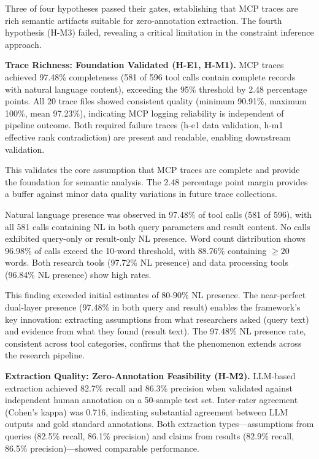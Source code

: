 
Three of four hypotheses passed their gates, establishing that MCP traces are rich semantic artifacts suitable for zero-annotation extraction. The fourth hypothesis (H-M3) failed, revealing a critical limitation in the constraint inference approach.

\textbf{Trace Richness: Foundation Validated (H-E1, H-M1).} MCP traces achieved 97.48\% completeness (581 of 596 tool calls contain complete records with natural language content), exceeding the 95\% threshold by 2.48 percentage points. All 20 trace files showed consistent quality (minimum 90.91\%, maximum 100\%, mean 97.23\%), indicating MCP logging reliability is independent of pipeline outcome. Both required failure traces (h-e1 data validation, h-m1 effective rank contradiction) are present and readable, enabling downstream validation.

This validates the core assumption that MCP traces are complete and provide the foundation for semantic analysis. The 2.48 percentage point margin provides a buffer against minor data quality variations in future trace collections.

Natural language presence was observed in 97.48\% of tool calls (581 of 596), with all 581 calls containing NL in both query parameters and result content. No calls exhibited query-only or result-only NL presence. Word count distribution shows 96.98\% of calls exceed the 10-word threshold, with 88.76\% containing $\geq 20$ words. Both research tools (97.72\% NL presence) and data processing tools (96.84\% NL presence) show high rates.

This finding exceeded initial estimates of 80-90\% NL presence. The near-perfect dual-layer presence (97.48\% in both query and result) enables the framework's key innovation: extracting assumptions from what researchers asked (query text) and evidence from what they found (result text). The 97.48\% NL presence rate, consistent across tool categories, confirms that the phenomenon extends across the research pipeline.

\textbf{Extraction Quality: Zero-Annotation Feasibility (H-M2).} LLM-based extraction achieved 82.7\% recall and 86.3\% precision when validated against independent human annotation on a 50-sample test set. Inter-rater agreement (Cohen's kappa) was 0.716, indicating substantial agreement between LLM outputs and gold standard annotations. Both extraction types---assumptions from queries (82.5\% recall, 86.1\% precision) and claims from results (82.9\% recall, 86.5\% precision)---showed comparable performance.

